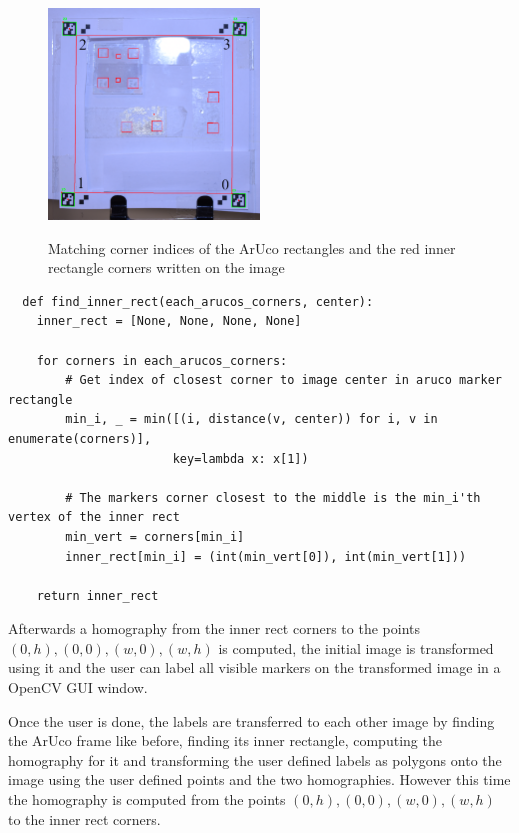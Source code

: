 \documentclass[10pt]{book}
\newenvironment{code}{\captionsetup{type=listing}}{}
\begin{document}
\begin{figure}
  \caption{Matching corner indices of the \ac{ArUco} rectangles and the red inner rectangle corners written on the image}
  \includegraphics[width=0.5\textwidth]{image/af_markings_3}
  \label{fig:inner_rect_indices}
\end{figure}

\begin{code}
\label{lst:irf}
\begin{verbatim}
  def find_inner_rect(each_arucos_corners, center):
    inner_rect = [None, None, None, None]

    for corners in each_arucos_corners:
        # Get index of closest corner to image center in aruco marker rectangle
        min_i, _ = min([(i, distance(v, center)) for i, v in enumerate(corners)], 
                       key=lambda x: x[1])
                
        # The markers corner closest to the middle is the min_i'th vertex of the inner rect
        min_vert = corners[min_i]
        inner_rect[min_i] = (int(min_vert[0]), int(min_vert[1]))
        
    return inner_rect
\end{verbatim}
\end{code}

Afterwards a homography from the inner rect corners to the points $(0,h), (0,0), (w,0), (w,h)$ is computed, the initial image is transformed using it and the user can label all visible markers on the transformed image in a \ac{OpenCV} \ac{GUI} window.

Once the user is done, the labels are transferred to each other image by finding the \ac{ArUco} frame like before, finding its inner rectangle, computing the homography for it and transforming the user defined labels as polygons onto the image using the user defined points and the two homographies. However this time the homography is computed from the points $(0,h), (0,0), (w,0), (w,h)$ to the inner rect corners.
\end{document}
